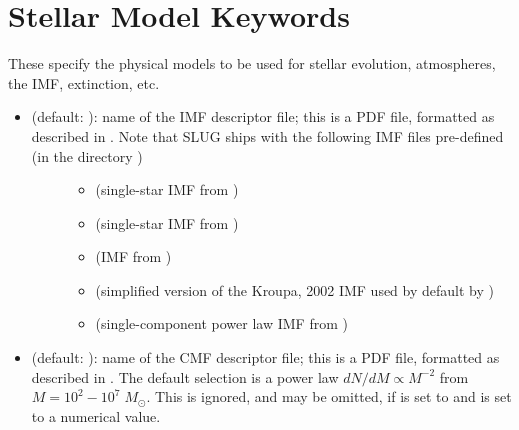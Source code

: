 \documentclass[letterpaper,10pt,english]{sphinxmanual}
\begin{document}
\section{Stellar Model Keywords}
\label{\detokenize{parameters:stellar-model-keywords}}\label{\detokenize{parameters:ssec-stellar-keywords}}
These specify the physical models to be used for stellar evolution, atmospheres, the IMF, extinction, etc.
\begin{itemize}
\item {} \begin{description}
\item[{ (default: ): name of the IMF descriptor file; this is a PDF file, formatted as described in {\hyperref[\detokenize{pdfs:sec-pdfs}]{}}. Note that SLUG ships with the following IMF files pre-defined (in the directory )}] \leavevmode\begin{itemize}
\item {} 
 (single-star IMF from )

\item {} 
 (single-star IMF from )

\item {} 
 (IMF from )

\item {} 
 (simplified version of the Kroupa, 2002 IMF used by default by )

\item {} 
 (single-component power law IMF from )

\end{itemize}

\end{description}

\item {} 
 (default: ): name of the CMF descriptor file; this is a PDF file, formatted as described in {\hyperref[\detokenize{pdfs:sec-pdfs}]{}}. The default selection is a power law \(dN/dM \propto M^{-2}\) from \(M = 10^2 - 10^7\;M_\odot\). This is ignored, and may be omitted, if  is set to  and  is set to a numerical value.


\end{itemize}
\end{document}

